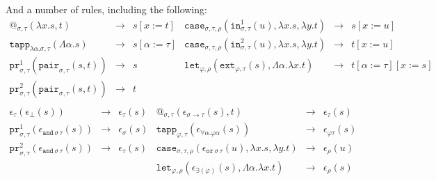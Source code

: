 \documentclass[a4paper,UKenglish,cleveref,autoref,numberwithinsect]{lipics-v2019}
\theoremstyle{definition}
\newcommand{\arrtype}{\rightarrow}
\newcommand{\quant}[2]{\forall #1.#2}
\newcommand{\abs}[2]{\lambda #1.#2}
\newcommand{\tabs}[2]{\Lambda #1.#2}
\newcommand{\red}{\longrightarrow}
\newcommand{\proj}{\mathtt{pr}}
\begin{document}
And a number of rules, including the following:
\[
\begin{array}{rclrcl}
@_{\sigma,\tau}(\abs{x}{s},t) & \red & s[x:=t] &
\mathtt{case}_{\sigma,\tau,\rho}(\mathtt{in}^1_{\sigma,\tau}(u),
  \abs{x}{s},\abs{y}{t}) & \red & s[x:=u] \\

\mathtt{tapp}_{\abs{\alpha}{\sigma},\tau}(\tabs{\alpha}{s}) & \red &
  s[\alpha:=\tau] &
\mathtt{case}_{\sigma,\tau,\rho}(\mathtt{in}^2_{\sigma,\tau}(u),
  \abs{x}{s},\abs{y}{t}) & \red & t[x:=u] \\

\proj^1_{\sigma,\tau}(\mathtt{pair}_{\sigma,\tau}(s,t)) & \red & s &
\mathtt{let}_{\varphi,\rho}(\mathtt{ext}_{\varphi,\tau}(s),\tabs{\alpha}{\abs{x}{t}}) & \red & t[\alpha:=\tau][x:=s] \\

\proj^2_{\sigma,\tau}(\mathtt{pair}_{\sigma,\tau}(s,t)) & \red & t \\
\end{array}
\]
\[
\begin{array}{rclrcl}
\epsilon_\tau(\epsilon_\bot(s)) & \red & \epsilon_\tau(s) &
@_{\sigma,\tau}(\epsilon_{\sigma \arrtype \tau}(s),t) & \red &
  \epsilon_\tau(s) \\

\proj^1_{\sigma,\tau}(\epsilon_{\mathtt{and}\,\sigma\,\tau}(s)) & \red &
  \epsilon_\sigma(s) &
\mathtt{tapp}_{\varphi,\tau}(
  \epsilon_{\quant{\alpha}{\varphi\alpha}}(s)) & \red &
  \epsilon_{\varphi\tau}(s) \\

\proj^2_{\sigma,\tau}(\epsilon_{\mathtt{and}\,\sigma\,\tau}(s)) & \red &
  \epsilon_\tau(s) &
\mathtt{case}_{\sigma,\tau,\rho}(\epsilon_{\mathtt{or}\,\sigma\,\tau}(
  u),\abs{x}{s},\abs{y}{t}) & \red & \epsilon_\rho(u) \\

& & & 
\mathtt{let}_{\varphi,\rho}(\epsilon_{\exists(\varphi)}(s),\tabs{\alpha}{\abs{x}{t}}) & \red &
  \epsilon_\rho(s) \\
\end{array}
\]
\end{document}

